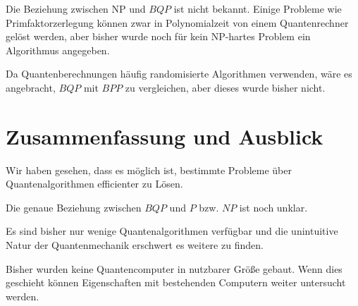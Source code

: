 \documentclass{acm_proc_article-sp}
\begin{document}

Die Beziehung zwischen NP und $BQP$ ist nicht bekannt. Einige Probleme wie Primfaktorzerlegung
können zwar in Polynomialzeit von einem Quantenrechner gelöst werden,
aber bisher wurde noch für kein NP-hartes Problem ein Algorithmus angegeben.

Da Quantenberechnungen häufig randomisierte Algorithmen verwenden, wäre es angebracht, $BQP$ mit $BPP$ zu vergleichen,
aber dieses wurde bisher nicht. 

\section{Zusammenfassung und Ausblick}

Wir haben gesehen, dass es möglich ist, bestimmte Probleme über Quantenalgorithmen efficienter zu Lösen.

Die genaue Beziehung zwischen $BQP$ und $P$ bzw. $NP$ ist noch unklar.

Es sind bisher nur wenige Quantenalgorithmen verfügbar und die unintuitive Natur der Quantenmechanik
erschwert es weitere zu finden. 

Bisher wurden keine Quantencomputer in nutzbarer Größe gebaut. Wenn dies geschieht können Eigenschaften
mit bestehenden Computern weiter untersucht werden.



\nocite{Barenco, Nielsen}
\end{document}
